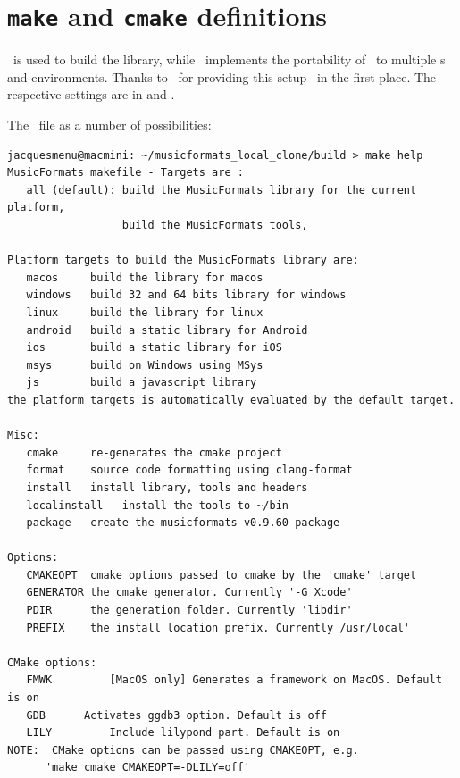\section{{\tt make} and {\tt cmake} definitions}

\make\ is used to build the library, while \cmake\ implements the portability of \mf\ to multiple \OS s and environments. Thanks to \fober\ for providing this setup \libmusicxml\ in the first place.
The respective settings are in  and .

The \make\ file as a number of possibilities:
\begin{lstlisting}[language=Terminal]
jacquesmenu@macmini: ~/musicformats_local_clone/build > make help
MusicFormats makefile - Targets are :
   all (default): build the MusicFormats library for the current platform,
                  build the MusicFormats tools,

Platform targets to build the MusicFormats library are:
   macos     build the library for macos
   windows   build 32 and 64 bits library for windows
   linux     build the library for linux
   android   build a static library for Android
   ios       build a static library for iOS
   msys      build on Windows using MSys
   js        build a javascript library
the platform targets is automatically evaluated by the default target.

Misc:
   cmake     re-generates the cmake project
   format    source code formatting using clang-format
   install   install library, tools and headers
   localinstall   install the tools to ~/bin
   package   create the musicformats-v0.9.60 package

Options:
   CMAKEOPT  cmake options passed to cmake by the 'cmake' target
   GENERATOR the cmake generator. Currently '-G Xcode'
   PDIR      the generation folder. Currently 'libdir'
   PREFIX    the install location prefix. Currently /usr/local'

CMake options:
   FMWK 		[MacOS only] Generates a framework on MacOS. Default is on
   GDB 		Activates ggdb3 option. Default is off
   LILY 		Include lilypond part. Default is on
NOTE:  CMake options can be passed using CMAKEOPT, e.g.
      'make cmake CMAKEOPT=-DLILY=off'
\end{lstlisting}


